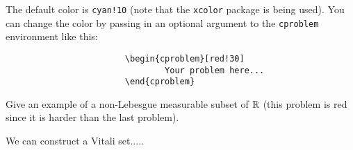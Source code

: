 \documentclass[mathshortcuts, colorful]{homework}
\begin{document}
		The default color is \texttt{cyan!10} (note that the \texttt{xcolor} package is being used). You can change the color by passing in an optional argument to the \texttt{cproblem} environment like this: 
		\begin{verbatim}
						\begin{cproblem}[red!30] 
								Your problem here...
						\end{cproblem}
		\end{verbatim}

		\begin{cproblem}[red!30] 
				Give an example of a non-Lebesgue measurable subset of $\mathbb{R}$ (this problem is red since it is harder than the last problem).
		\end{cproblem}
		\begin{soln}
				We can construct a Vitali set.....
		\end{soln}
\end{document}
